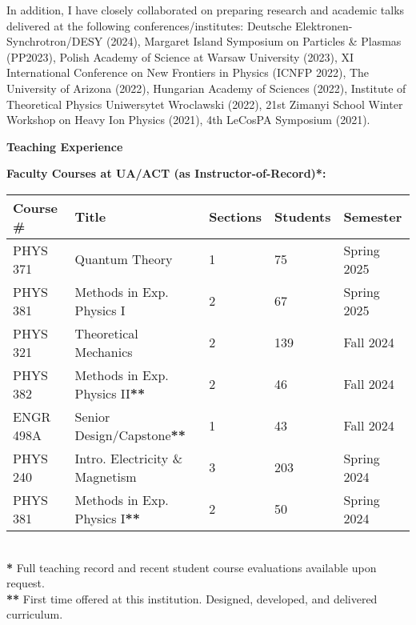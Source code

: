 \documentclass[11pt]{article}
\begin{document}
\noindent In addition, I have closely collaborated on preparing research and academic talks delivered at the following conferences/institutes: Deutsche Elektronen-Synchrotron/DESY (2024), Margaret Island Symposium on Particles \& Plasmas (PP2023), Polish Academy of Science at Warsaw University (2023), XI International Conference on New Frontiers in Physics (ICNFP 2022), The University of Arizona (2022), Hungarian Academy of Sciences (2022), Institute of Theoretical Physics Uniwersytet Wroclawski (2022), 21st Zimanyi School Winter Workshop on Heavy Ion Physics (2021), 4th LeCosPA Symposium (2021).

\medskip

{\Large\textbf{Teaching Experience}}

\textbf{Faculty Courses at UA/ACT (as Instructor-of-Record)*:}\\
{\normalsize
\begin{tabular}{@{}p{2.5cm} p{6.0cm} p{2.0cm} p{2.0cm} p{3.0cm}@{}}
    \toprule
    \textbf{Course \#} & \textbf{Title} & \textbf{Sections} & \textbf{Students} & \textbf{Semester} \\
    \midrule
    PHYS 371   & Quantum Theory                    & 1 & 75  & Spring 2025 \\
    PHYS 381   & Methods in Exp. Physics I         & 2 & 67  & Spring 2025 \\
    PHYS 321   & Theoretical Mechanics             & 2 & 139 & Fall 2024 \\
    PHYS 382   & Methods in Exp. Physics II\textbf{**}       & 2 & 46  & Fall 2024 \\
    ENGR 498A  & Senior Design/Capstone\textbf{**}           & 1 & 43  & Fall 2024 \\
    PHYS 240   & Intro. Electricity \& Magnetism    & 3 & 203 & Spring 2024 \\
    PHYS 381   & Methods in Exp. Physics I\textbf{**}        & 2 & 50  & Spring 2024 \\
    \bottomrule
\end{tabular}
}\\[0.0em]

\textbf{*} Full teaching record and recent student course evaluations available upon request.\\[0.0em]
\textbf{**} First time offered at this institution. Designed, developed, and delivered curriculum.
\end{document}
